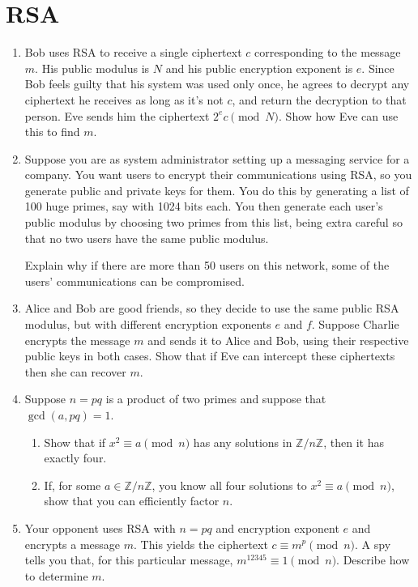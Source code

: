 \documentclass[11pt,letterpaper]{article}
\newcommand{\Z}{\mathbb{Z}}
\begin{document}
\section{RSA}

\begin{enumerate}
    \item Bob uses RSA to receive a single ciphertext $c$ corresponding to the message $m$.
    His public modulus is $N$ and his public encryption exponent is $e$.
    Since Bob feels guilty that his system was used only once, he agrees to decrypt any ciphertext he receives as long as it's not $c$, and return the decryption to that person.
    Eve sends him the ciphertext $2^ec\pmod N$.
    Show how Eve can use this to find $m$.


    \item Suppose you are as system administrator setting up a messaging service for a company.
    You want users to encrypt their communications using RSA, so you generate public and private keys for them.
    You do this by generating a list of 100 huge primes, say with 1024 bits each.
    You then generate each user's public modulus by choosing two primes from this list, being extra careful so that no two users have the same public modulus.

    Explain why if there are more than 50 users on this network, some of the users' communications can be compromised.


    \item Alice and Bob are good friends, so they decide to use the same public RSA modulus, but with different encryption exponents $e$ and $f$.
    Suppose Charlie encrypts the message $m$ and sends it to Alice and Bob, using their respective public keys in both cases.
    Show that if Eve can intercept these ciphertexts then she can recover $m$.

    \item Suppose $n = pq$ is a product of two primes and suppose that $\gcd(a, pq) = 1$.
    \begin{enumerate}
        \item Show that if $x^2 \equiv a\pmod n$ has any solutions in $\Z/n\Z$, then it has exactly four.

        \item If, for some $a\in \Z/n\Z$, you know all four solutions to $x^2\equiv a\pmod n$, show that you can efficiently factor $n$.
    \end{enumerate}


    \item Your opponent uses RSA with $n=pq$ and encryption exponent $e$ and encrypts a message $m$.
    This yields the ciphertext $c\equiv m^p\pmod n$.
    A spy tells you that, for this particular message, $m^{12345}\equiv 1\pmod n$.
    Describe how to determine $m$.
\end{enumerate}
\end{document}
